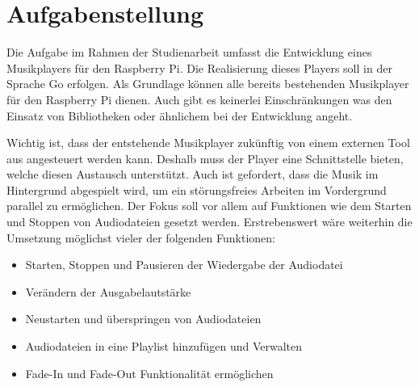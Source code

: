
\chapter{Aufgabenstellung}
Die Aufgabe im Rahmen der Studienarbeit umfasst die Entwicklung eines
Musikplayers für den Raspberry Pi. Die Realisierung dieses Players soll in der
Sprache Go erfolgen. Als Grundlage können alle bereits bestehenden Musikplayer
für den Raspberry Pi dienen. Auch gibt es keinerlei Einschränkungen was den
Einsatz von Bibliotheken oder ähnlichem bei der Entwicklung angeht. \hfill
\break

Wichtig ist, dass der entstehende Musikplayer zukünftig von einem externen Tool aus
angesteuert werden kann. Deshalb muss der Player eine Schnittstelle bieten,
welche diesen Austausch unterstützt. Auch ist gefordert, dass die Musik im
Hintergrund abgespielt wird, um ein störungsfreies Arbeiten im Vordergrund
parallel zu ermöglichen. \hfill \break
Der Fokus soll vor allem auf Funktionen wie dem Starten und Stoppen von
Audiodateien gesetzt werden. Erstrebenswert wäre weiterhin die Umsetzung
möglichst vieler der folgenden Funktionen: 

\begin{itemize}
\item Starten, Stoppen und Pausieren der Wiedergabe der Audiodatei
\item Verändern der Ausgabelautstärke
\item Neustarten und überspringen von Audiodateien
\item Audiodateien in eine Playlist hinzufügen und Verwalten
\item Fade-In und Fade-Out Funktionalität ermöglichen
\end{itemize}

